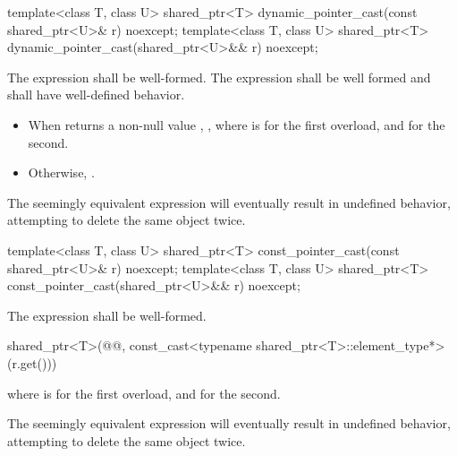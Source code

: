 %
\begin{itemdecl}
template<class T, class U>
  shared_ptr<T> dynamic_pointer_cast(const shared_ptr<U>& r) noexcept;
template<class T, class U>
  shared_ptr<T> dynamic_pointer_cast(shared_ptr<U>&& r) noexcept;
\end{itemdecl}

\begin{itemdescr}
\pnum
\requires The expression 
shall be well-formed.
The expression 
shall be well formed and shall have well-defined behavior.

\pnum
\returns
\begin{itemize}
\item When 
  returns a non-null value ,
  ,
  where  is  for the first overload, and
   for the second.
\item Otherwise, .
\end{itemize}

\pnum
\begin{note}
The seemingly equivalent expression
 will eventually result in
undefined behavior, attempting to delete the same object twice.
\end{note}
\end{itemdescr}

%
\begin{itemdecl}
template<class T, class U>
  shared_ptr<T> const_pointer_cast(const shared_ptr<U>& r) noexcept;
template<class T, class U>
  shared_ptr<T> const_pointer_cast(shared_ptr<U>&& r) noexcept;
\end{itemdecl}

\begin{itemdescr}
\pnum
\requires The expression  shall
be well-formed.

\pnum
\returns
\begin{codeblock}
shared_ptr<T>(@@, const_cast<typename shared_ptr<T>::element_type*>(r.get()))
\end{codeblock}
where  is  for the first overload, and
 for the second.

\pnum
\begin{note}
The seemingly equivalent expression
 will eventually result in
undefined behavior, attempting to delete the same object twice.
\end{note}
\end{itemdescr}

